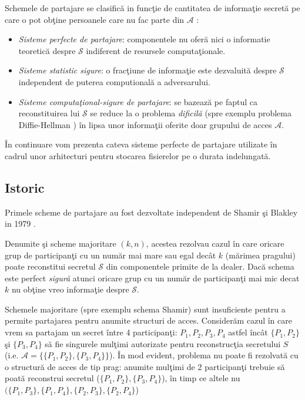 \documentclass{llncs}
\begin{document}
Schemele de partajare se clasific\u{a} in func\c{t}ie de cantitatea de informa\c{t}ie secret\u{a} pe care o pot ob\c{t}ine persoanele care nu fac parte din $\mathcal{A}$ \cite{Martin:2008}:
\begin{itemize}
	\item \textit{Sisteme perfecte de partajare}: componentele nu ofer\u{a} nici o informatie teoretic\u{a} despre $\mathcal{S}$ indiferent de resursele computa\c{t}ionale.
	\item \textit{Sisteme statistic sigure}: o frac\c{t}iune de informa\c{t}ie este dezvaluit\u{a} despre $\mathcal{S}$ independent de puterea computional\u{a} a adversarului.
	\item \textit{Sisteme computa\c{t}ional-sigure de partajare}: se bazeaz\u{a} pe faptul ca reconstituirea lui $\mathcal{S}$ se reduce la o problema \textit{dificil\u{a}} (spre exemplu problema Diffie-Hellman \cite{boneh:1998decision} ) \^{i}n lipsa unor informa\c{t}ii oferite doar grupului de acces $\mathcal{A}$.

\end{itemize} 

\^{I}n continuare vom prezenta cateva sisteme perfecte de partajare utilizate \^{i}n cadrul unor arhitecturi pentru stocarea fisierelor pe o durata indelungat\u{a}.

\subsection{Istoric}

Primele scheme de partajare au fost dezvoltate independent de Shamir \c{s}i Blakley in 1979 \cite{B:1979, S:1979}.

Denumite \c{s}i scheme majoritare $(k, n)$, acestea rezolvau cazul \^{i}n care oricare grup de participan\c{t}i cu un num\u{a}r mai mare sau egal dec\^{a}t $k$  (m\u{a}rimea pragului) poate reconstitui secretul $\mathcal{S}$ din componentele primite de la dealer. Dac\u{a} schema este perfect \textit{sigur\u{a}} atunci oricare grup cu un num\u{a}r de participan\c{t}i mai mic decat $k$ nu ob\c{t}ine vreo informa\c{t}ie despre $\mathcal{S}$.


Schemele majoritare (spre exemplu schema Shamir) sunt insuficiente pentru a permite partajarea pentru anumite structuri de acces. Consider\u{a}m cazul \^{i}n care vrem sa partajam un secret \^{i}ntre 4 participan\c{t}i: $P_1, P_2, P_3, P_4$ astfel \^{i}nc\^{a}t $\{P_1,P_2\}$ \c{s}i $\{P_3,P_4\}$ s\u{a} fie singurele mul\c{t}imi autorizate pentru reconstruc\c{t}ia secretului $S$ (i.e. $\mathcal{A} = \{ \{P_1,P_2\}, \{P_3,P_4\} \}$). \^{I}n mod evident, problema nu poate fi rezolvat\u{a} cu o structur\u{a} de acces de tip prag: anumite mul\c{t}imi de 2 participan\c{t}i trebuie s\u{a} poat\u{a} reconstrui secretul ($ \{P_1,P_2\}, \{P_3,P_4\} $), \^{i}n timp ce altele nu $( \{P_1,P_3\}, \{P_1,P_4\}, \{P_2,P_3\}, \{P_2,P_4\} $)
\end{document}
